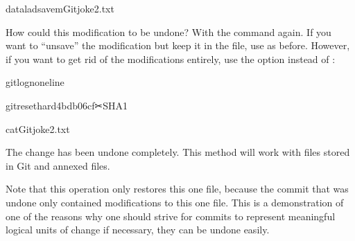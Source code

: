 \begin{sphinxVerbatim}[commandchars=\\\{\}]
dataladsave\PYGZhy{}mGitjoke2.txt
\end{sphinxVerbatim}

\sphinxAtStartPar
How could this modification to  be undone?
With the  command again. If you want to
“unsave” the modification but keep it in the file, use
 as before. However, if you want to
get rid of the modifications entirely, use the option 
instead of :

\begin{sphinxVerbatim}[commandchars=\\\{\}]
gitlog\PYGZhy{}n\PYGZhy{}\PYGZhy{}oneline
\end{sphinxVerbatim}

\begin{sphinxVerbatim}[commandchars=\\\{\}]
gitreset\PYGZhy{}\PYGZhy{}hard4bdb06cf✂SHA1
\end{sphinxVerbatim}

\begin{sphinxVerbatim}[commandchars=\\\{\}]
catGitjoke2.txt
\end{sphinxVerbatim}

\sphinxAtStartPar
The change has been undone completely. This method will work with
files stored in Git and annexed files.

\sphinxAtStartPar
Note that this operation only restores this one file, because the commit that
was undone only contained modifications to this one file. This is a
demonstration of one of the reasons why one should strive for commits to
represent meaningful logical units of change \textendash{} if necessary, they can be
undone easily.


